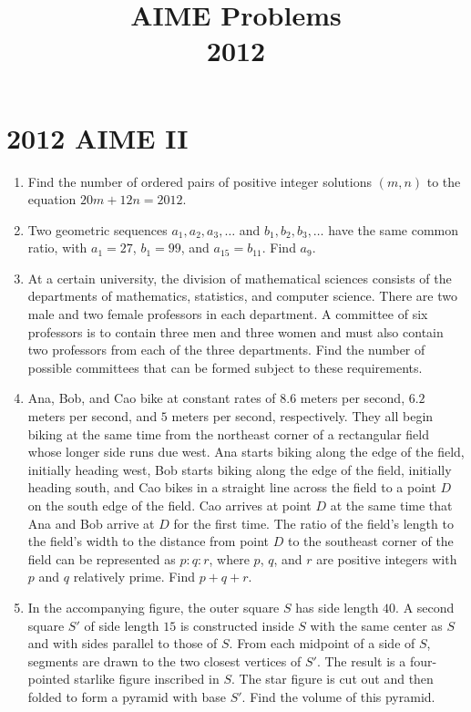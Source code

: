 \documentclass{article}
\title{AIME Problems \\ 2012}
\date{}
\begin{document}
\maketitle\thispagestyle{fancy}\newpage\section*{2012 AIME II}\begin{enumerate}[label=\arabic*., itemsep=0.5em]\item Find the number of ordered pairs of positive integer solutions \((m, n)\) to the equation \(20m + 12n = 2012\).\par \vspace{0.5em}\item Two geometric sequences \(a_1, a_2, a_3, \ldots\) and \(b_1, b_2, b_3, \ldots\) have the same common ratio, with \(a_1 = 27\), \(b_1=99\), and \(a_{15}=b_{11}\). Find \(a_9\).\par \vspace{0.5em}\item At a certain university, the division of mathematical sciences consists of the departments of mathematics, statistics, and computer science. There are two male and two female professors in each department. A committee of six professors is to contain three men and three women and must also contain two professors from each of the three departments. Find the number of possible committees that can be formed subject to these requirements.\par \vspace{0.5em}\item Ana, Bob, and Cao bike at constant rates of \(8.6\) meters per second, \(6.2\) meters per second, and \(5\) meters per second, respectively. They all begin biking at the same time from the northeast corner of a rectangular field whose longer side runs due west. Ana starts biking along the edge of the field, initially heading west, Bob starts biking along the edge of the field, initially heading south, and Cao bikes in a straight line across the field to a point \(D\) on the south edge of the field. Cao arrives at point \(D\) at the same time that Ana and Bob arrive at \(D\) for the first time. The ratio of the field's length to the field's width to the distance from point \(D\) to the southeast corner of the field can be represented as \(p : q : r\), where \(p\), \(q\), and \(r\) are positive integers with \(p\) and \(q\) relatively prime. Find \(p+q+r\).\par \vspace{0.5em}\item In the accompanying figure, the outer square \(S\) has side length \(40\). A second square \(S'\) of side length \(15\) is constructed inside \(S\) with the same center as \(S\) and with sides parallel to those of \(S\). From each midpoint of a side of \(S\), segments are drawn to the two closest vertices of \(S'\). The result is a four-pointed starlike figure inscribed in \(S\). The star figure is cut out and then folded to form a pyramid with base \(S'\). Find the volume of this pyramid.


\end{enumerate}
\end{document}
